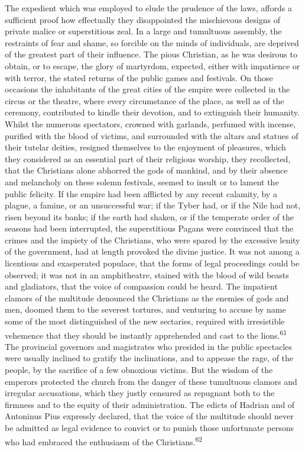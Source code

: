 The expedient which was employed to elude the prudence of the
laws, affords a sufficient proof how effectually they
disappointed the mischievous designs of private malice or
superstitious zeal. In a large and tumultuous assembly, the
restraints of fear and shame, so forcible on the minds of
individuals, are deprived of the greatest part of their
influence. The pious Christian, as he was desirous to obtain, or
to escape, the glory of martyrdom, expected, either with
impatience or with terror, the stated returns of the public games
and festivals. On those occasions the inhabitants of the great
cities of the empire were collected in the circus or the theatre,
where every circumstance of the place, as well as of the
ceremony, contributed to kindle their devotion, and to extinguish
their humanity. Whilst the numerous spectators, crowned with
garlands, perfumed with incense, purified with the blood of
victims, and surrounded with the altars and statues of their
tutelar deities, resigned themselves to the enjoyment of
pleasures, which they considered as an essential part of their
religious worship, they recollected, that the Christians alone
abhorred the gods of mankind, and by their absence and melancholy
on these solemn festivals, seemed to insult or to lament the
public felicity. If the empire had been afflicted by any recent
calamity, by a plague, a famine, or an unsuccessful war; if the
Tyber had, or if the Nile had not, risen beyond its banks; if the
earth had shaken, or if the temperate order of the seasons had
been interrupted, the superstitious Pagans were convinced that
the crimes and the impiety of the Christians, who were spared by
the excessive lenity of the government, had at length provoked
the divine justice. It was not among a licentious and exasperated
populace, that the forms of legal proceedings could be observed;
it was not in an amphitheatre, stained with the blood of wild
beasts and gladiators, that the voice of compassion could be
heard. The impatient clamors of the multitude denounced the
Christians as the enemies of gods and men, doomed them to the
severest tortures, and venturing to accuse by name some of the
most distinguished of the new sectaries, required with
irresistible vehemence that they should be instantly apprehended
and cast to the lions.\textsuperscript{61} The provincial governors and
magistrates who presided in the public spectacles were usually
inclined to gratify the inclinations, and to appease the rage, of
the people, by the sacrifice of a few obnoxious victims. But the
wisdom of the emperors protected the church from the danger of
these tumultuous clamors and irregular accusations, which they
justly censured as repugnant both to the firmness and to the
equity of their administration. The edicts of Hadrian and of
Antoninus Pius expressly declared, that the voice of the
multitude should never be admitted as legal evidence to convict
or to punish those unfortunate persons who had embraced the
enthusiasm of the Christians.\textsuperscript{62}


